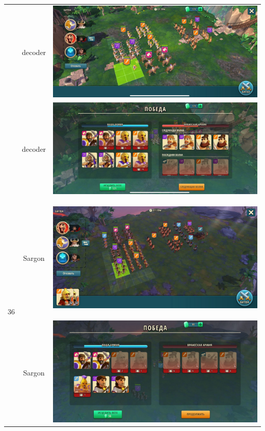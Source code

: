 \begin{longtable}{|c|c|c|}
	& decoder &
	\includegraphics[width=0.75\linewidth]{./parts/media/TreasureHunt/35/decoder/photo_2022-04-07_10-06-11.jpg} \\
	& decoder &
	\includegraphics[width=0.75\linewidth]{./parts/media/TreasureHunt/35/decoder/photo_2022-04-07_10-06-08.jpg} \\
	\hline
	\multirow{16}{*}{36} & Sargon &
	\hypertarget{fight36}{\includegraphics[width=0.75\linewidth]{./parts/media/TreasureHunt/36/sargon/photo_2022-04-07_13-16-23.jpg}} \\
	& Sargon &
	\includegraphics[width=0.75\linewidth]{./parts/media/TreasureHunt/36/sargon/photo_2022-04-07_13-16-46.jpg} \\

\end{longtable}
